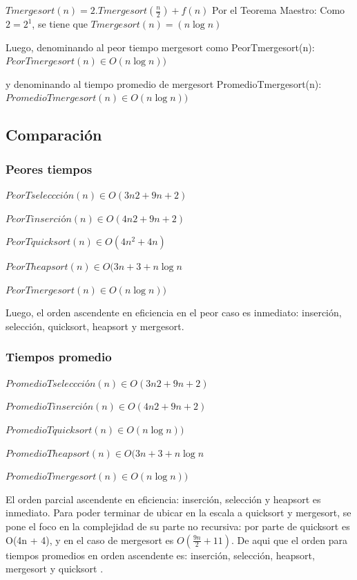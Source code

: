 \documentclass[titlepage,a4paper]{article}
\begin{document}
$Tmergesort(n) = 2.Tmergesort(\frac{n}{2}) + f(n)$
Por el Teorema Maestro: Como $2 = 2^1$, se tiene que $Tmergesort(n) =(n \log n)$

Luego, denominando al peor tiempo mergesort como PeorTmergesort(n): $PeorTmergesort(n) \in O(n \log n))$

y denominando al tiempo promedio de mergesort PromedioTmergesort(n): $PromedioTmergesort(n) \in O(n \log n))$

\subsection{Comparación}

\subsubsection{Peores tiempos}

$PeorTseleccción(n) \in O( 3n2 + 9n + 2)$ 

$PeorTinserción(n) \in O(4n2 + 9n + 2)$

$PeorTquicksort(n) \in O(4n^2 + 4n)$

$PeorTheapsort(n)  \in O(3n + 3 +n \log n$

$PeorTmergesort(n) \in O(n \log n))$

Luego, el orden ascendente en eficiencia en el peor caso es inmediato:
inserción, selección, quicksort, heapsort y mergesort.

\subsubsection{Tiempos promedio}

$PromedioTseleccción(n)  \in O( 3n2 + 9n + 2)$

$PromedioTinserción(n) \in O(4n2 + 9n + 2) $

$PromedioTquicksort(n) \in O(n \log n))$

$PromedioTheapsort(n) \in O(3n + 3 +n \log n$ 

$PromedioTmergesort(n) \in O(n \log n))$

El orden parcial ascendente en eficiencia: inserción, selección y heapsort es inmediato. Para poder terminar de ubicar en la escala a quicksort y mergesort, se pone el foco en la complejidad de su parte no recursiva: por parte de quicksort es O(4n + 4), y en el caso de mergesort es $O( \frac{9n}{2} +11 )$. De aqui que el orden para tiempos promedios en orden ascendente es: inserción, selección, heapsort, mergesort y quicksort .
\end{document}
